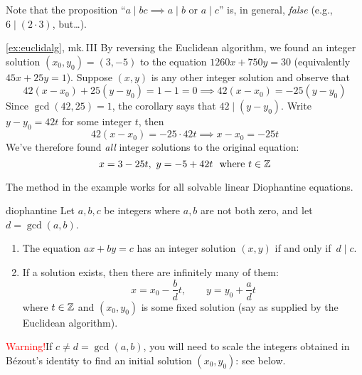 Note that the proposition ``$a\mid bc\implies a\mid b$ or $a\mid c$'' is, in general, \emph{false} (e.g., $6\mid(2\cdot 3)$, but\ldots).


\begin{example*}{\ref{ex:euclidalg}, mk.\,III}{}
	By reversing the Euclidean algorithm, we found an integer solution $(x_0,y_0)=(3,-5)$ to the equation $1260x+750y=30$ (equivalently $45x+25y=1$). Suppose $(x,y)$ is any other integer solution and observe that
	\[
		42(x-x_0)+25(y-y_0)=1-1=0 \implies 42(x-x_0)=-25(y-y_0)
	\]
	Since $\gcd(42,25)=1$, the corollary says that $42\mid(y-y_0)$. Write $y-y_0=42t$ for some integer $t$, then
	\[
		42(x-x_0)=-25\cdot 42t\implies x-x_0=-25t
	\]
	We've therefore found \emph{all} integer solutions to the original equation:
	\[
		x=3-25t,\ y=-5+42t\ \text{ where }t\in\mathbb{Z}
	\]
\end{example*}

\goodbreak

The method in the example works for all solvable linear Diophantine equations.

\begin{thm}{}{diophantine}
	Let $a,b,c$ be integers where $a,b$ are not both zero, and let $d=\gcd(a,b)$.
	\begin{enumerate}\itemsep0pt
	  \item The equation $ax+by=c$ has an integer solution $(x,y)$ if and only if $\,d\mid c$.
	  \item If a solution exists, then there are infinitely many of them:%
		\[
			x=x_0-\frac bd t,\qquad y=y_0+\frac ad t\tag{$\ast$}
		\]
		where $t\in\mathbb{Z}$ and $(x_0,y_0)$ is some fixed solution (say as supplied by the Euclidean algorithm).
	\end{enumerate} 
\end{thm}


\textcolor{red}{Warning!}\lstsp If $c\neq d=\gcd(a,b)$, you will need to scale the integers obtained in Bézout's identity to find an initial solution $(x_0,y_0)$: see below.


